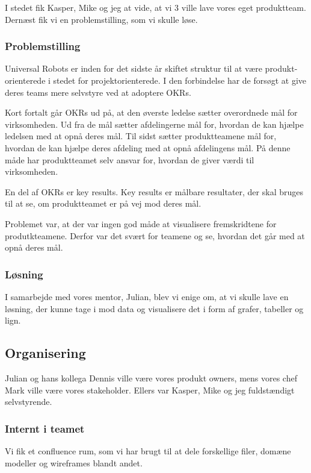 \documentclass[a4paper]{article}
\begin{document}
I stedet fik Kasper, Mike og jeg at vide,
at vi 3 ville lave vores eget produktteam.
Dernæst fik vi en problemstilling, som vi skulle løse.

\subsubsection{Problemstilling}
Universal Robots er inden for det sidste år skiftet struktur til at være 
produkt-orienterede i stedet for projektorienterede.
I den forbindelse har de forsøgt at give deres teams mere selvstyre ved at 
adoptere OKRs.

Kort fortalt går OKRs ud på, 
at den øverste ledelse sætter overordnede mål for virksomheden.
Ud fra de mål sætter afdelingerne mål for,
hvordan de kan hjælpe ledelsen med at opnå deres mål.
Til sidst sætter produktteamene mål for, 
hvordan de kan hjælpe deres afdeling med at opnå afdelingens mål.
På denne måde har produktteamet selv ansvar for,
hvordan de giver værdi til virksomheden.

En del af OKRs er key results. 
Key results er målbare resultater, der skal bruges til at se,
om produktteamet er på vej mod deres mål.

Problemet var, at der var ingen god måde at visualisere 
fremskridtene for produtkteamene.
Derfor var det svært for teamene og se, hvordan det går med at opnå deres mål.

\subsubsection{Løsning}
I samarbejde med vores mentor, Julian, blev vi enige om, at vi skulle lave en 
løsning, der kunne tage i mod data og visualisere det i form af 
grafer, tabeller og lign.

\subsection{Organisering}
\label{organisering}
Julian og hans kollega Dennis ville være vores produkt owners,
mens vores chef Mark ville være vores stakeholder.
Ellers var Kasper, Mike og jeg fuldstændigt selvstyrende.

\subsubsection{Internt i teamet}
Vi fik et confluence rum, som vi har brugt til at dele forskellige filer, 
domæne modeller og wireframes blandt andet.
\end{document}
